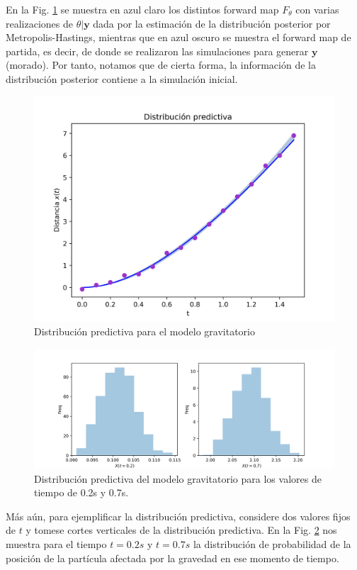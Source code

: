 En la Fig. \ref{Fig. 3.2.2.06} se muestra en azul claro los distintos forward map $F_{\theta}$ con varias realizaciones de $\theta|\mathbf{y}$ dada por la estimación de la distribución posterior por Metropolis-Hastings, mientras que en azul oscuro se muestra el forward map de partida, es decir, de donde se realizaron las simulaciones para generar $\mathbf{y}$ (morado). Por tanto, notamos que de cierta forma, la información de la distribución posterior contiene a la simulación inicial.

\begin{figure}
    \centering 
    \includegraphics[width = 10 cm ]{img/Exp_Central_gravedad_sigma/Figuras/Generales/Predictiva_gravedad_sigma.png} 
    \caption{Distribución predictiva para el modelo gravitatorio}
    \label{Fig. 3.2.2.06}
\end{figure} 

\begin{figure}[H]
    \centering 
    \includegraphics[width = 15 cm]{img/Exp_Central_gravedad_sigma/Figuras/Generales/TiempoFijo_gravedad_sigma.png} 
    \caption{Distribución predictiva del modelo gravitatorio para los valores de tiempo de 0.2s y 0.7s.}
    \label{Fig. 3.2.2.07}
\end{figure} 

Más aún, para ejemplificar la distribución predictiva, considere dos valores fijos de $t$ y tomese cortes verticales de la distribución predictiva. En la Fig. \ref{Fig. 3.2.2.07} nos muestra para el tiempo $t = 0.2 s$ y $t = 0.7s$ la distribución de probabilidad de la posición de la partícula afectada por la gravedad en ese momento de tiempo. 

